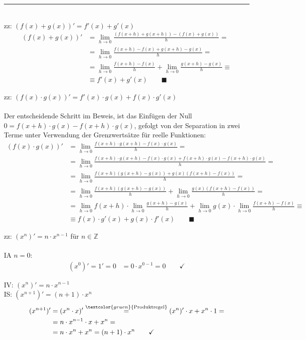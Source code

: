 \documentclass{article}
\newcommand{\comment}[1]{\textcolor{gruen}{\text{#1}}}
\begin{document}
{\color{violet}
\hrule
	\\
	zz: $(f(x)+g(x))' = f'(x) + g'(x)$
		\begin{align*}
			(f(x) + g(x))' &= \lim_{h\rightarrow 0} \frac{ (f(x+h) + g(x+h)) - (f(x) + g(x)) }{h} = \\
			&= \lim_{h\rightarrow 0} \frac{ f(x+h) - f(x) + g(x+h) - g(x) }{h} = \\
			&= \lim_{h\rightarrow 0} \frac{f(x+h) - f(x)}{h} + \lim_{h\rightarrow 0} \frac{g(x+h) - g(x)}{h} \equiv \\
			&\equiv f'(x) + g'(x) \qquad \blacksquare
		\end{align*}


	zz: $(f(x) \cdot g(x))' = f'(x) \cdot g(x) + f(x) \cdot g'(x)$\\
	\\
	Der entscheidende Schritt im Beweis, ist das Einfügen der Null $0 = f(x+h) \cdot g(x) - f(x+h) \cdot g(x)$, gefolgt von der Separation in zwei Terme unter Verwendung der Grenzwertsätze für reelle Funktionen:
		\begin{align*}
			(f(x) \cdot g(x))' &= \lim_{h\rightarrow 0} \frac{f(x+h) \cdot g(x+h) - f(x) \cdot g(x)}{h} = \\
			&= \lim_{h\rightarrow 0} \frac{f(x+h) \cdot g(x+h) - f(x) \cdot g(x) + f(x+h) \cdot g(x) - f(x+h) \cdot g(x)}{h} = \\
			&= \lim_{h\rightarrow 0} \frac{f(x+h)(g(x+h) - g(x)) + g(x)(f(x+h) - f(x))}{h} = \\
			&= \lim_{h\rightarrow 0} \frac{f(x+h)(g(x+h) - g(x))}{h} + \lim_{h\rightarrow 0} \frac{g(x)(f(x+h) - f(x))}{h} = \\
			&= \lim_{h\rightarrow 0}f(x+h) \cdot \lim_{h\rightarrow 0} \frac{g(x+h) - g(x)}{h} + \lim_{h\rightarrow 0}g(x) \cdot \lim_{h\rightarrow 0}\frac{f(x+h) - f(x)}{h} \equiv \\
			&\equiv f(x) \cdot g'(x) + g(x) \cdot f'(x) \qquad \blacksquare
		\end{align*}


	zz: $(x^n)' = n \cdot x^{n-1}$ für $n \in \mathbb{Z}$\\
	\\
	IA $n=0$:
		\begin{align*}
			(x^0)' = 1' = 0 &= 0 \cdot x^{0-1} = 0 \qquad \checkmark
		\end{align*}
	
	IV: $(x^n)' = n \cdot x^{n-1}$\\
	IS: $(x^{n+1})' = (n+1) \cdot x^{n}$
		\begin{align*}
			(x^{n+1})' &= (x^n \cdot x)' \stackrel{\comment{Produktregel}}{=} (x^n)' \cdot x + x^n \cdot 1 = \\
			&= n \cdot x^{n-1} \cdot x + x^n = \\
			&= n \cdot x^n + x^n = (n+1) \cdot x^n \qquad \checkmark
		\end{align*}

}
\end{document}
